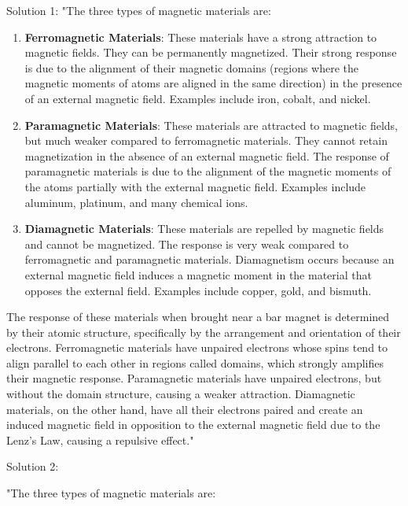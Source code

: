 Solution 1: 
"The three types of magnetic materials are:

\begin{enumerate}
    \item \textbf{Ferromagnetic Materials}: These materials have a strong attraction to magnetic fields. They can be permanently magnetized. Their strong response is due to the alignment of their magnetic domains (regions where the magnetic moments of atoms are aligned in the same direction) in the presence of an external magnetic field. Examples include iron, cobalt, and nickel.
    \item \textbf{Paramagnetic Materials}: These materials are attracted to magnetic fields, but much weaker compared to ferromagnetic materials. They cannot retain magnetization in the absence of an external magnetic field. The response of paramagnetic materials is due to the alignment of the magnetic moments of the atoms partially with the external magnetic field. Examples include aluminum, platinum, and many chemical ions.
    \item \textbf{Diamagnetic Materials}: These materials are repelled by magnetic fields and cannot be magnetized. The response is very weak compared to ferromagnetic and paramagnetic materials. Diamagnetism occurs because an external magnetic field induces a magnetic moment in the material that opposes the external field. Examples include copper, gold, and bismuth.
\end{enumerate}

The response of these materials when brought near a bar magnet is determined by their atomic structure, specifically by the arrangement and orientation of their electrons. Ferromagnetic materials have unpaired electrons whose spins tend to align parallel to each other in regions called domains, which strongly amplifies their magnetic response. Paramagnetic materials have unpaired electrons, but without the domain structure, causing a weaker attraction. Diamagnetic materials, on the other hand, have all their electrons paired and create an induced magnetic field in opposition to the external magnetic field due to the Lenz's Law, causing a repulsive effect."

Solution 2: 

"The three types of magnetic materials are:

